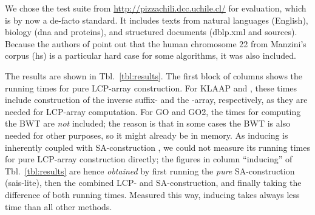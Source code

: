 \documentclass[11pt,onecolumn,final]{article} \usepackage[latin1]{inputenc}
\theoremstyle{plain}
\theoremstyle{remark}
\begin{document}
We chose the test suite from \url{http://pizzachili.dcc.uchile.cl/} for evaluation, which is by now a de-facto standard. It includes texts from natural languages (English), biology (dna and proteins), and structured documents (dblp.xml and sources). Because the authors of \cite{gog11fast} point out that the human chromosome 22 from Manzini's corpus (hs) is a particular hard case for some algorithms, it was also included.

The results are shown in Tbl.~\ref{tbl:results}. The first block of columns shows the running times for pure LCP-array construction. For \textsf{KLAAP} and , these times include construction of the inverse suffix- and the -array, respectively, as they are needed for LCP-array computation. For \textsf{GO} and \textsf{GO2}, the times for computing the BWT are \emph{not} included; the reason is that in some cases the BWT is also needed for other purposes, so it might already be in memory. As \textsf{inducing} is inherently coupled with SA-construction \cite{nong09linear}, we could not measure its running times for pure LCP-array construction directly; the figures in column ``\textsf{inducing}'' of Tbl.~\ref{tbl:results} are hence \emph{obtained} by first running the \emph{pure} SA-construction (\textsf{sais-lite}), then the combined LCP- and SA-construction, and finally taking the difference of both running times. Measured this way, \textsf{inducing} takes always less time than all other methods.
\end{document}
